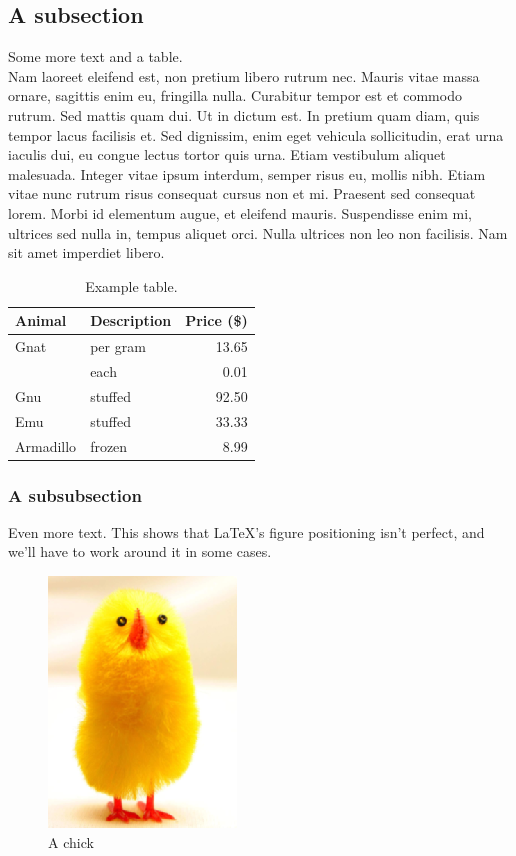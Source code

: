 \documentclass[12pt]{article} %
\begin{document}
\subsection{A subsection}

Some more text and a table. \\

Nam laoreet eleifend est, non pretium libero rutrum nec. Mauris vitae massa ornare, sagittis enim eu, fringilla nulla. Curabitur tempor est et commodo rutrum. Sed mattis quam dui. Ut in dictum est. In pretium quam diam, quis tempor lacus facilisis et. Sed dignissim, enim eget vehicula sollicitudin, erat urna iaculis dui, eu congue lectus tortor quis urna. Etiam vestibulum aliquet malesuada. Integer vitae ipsum interdum, semper risus eu, mollis nibh. Etiam vitae nunc rutrum risus consequat cursus non et mi. Praesent sed consequat lorem. Morbi id elementum augue, et eleifend mauris. Suspendisse enim mi, ultrices sed nulla in, tempus aliquet orci. Nulla ultrices non leo non facilisis. Nam sit amet imperdiet libero. 

\begin{table}[h]
    \centering
    \label{table:ex}
    \begin{tabular}{llr}
        \toprule
        Animal    & Description & Price (\$) \\
        \midrule
        Gnat      & per gram    & 13.65      \\
                  & each        & 0.01       \\
        Gnu       & stuffed     & 92.50      \\
        Emu       & stuffed     & 33.33      \\
        Armadillo & frozen      & 8.99       \\
        \bottomrule
    \end{tabular}
    \caption{Example table.}
\end{table}


\subsubsection{A subsubsection}

Even more text. This shows that \LaTeX's figure positioning isn't perfect, and we'll have to work around it in some cases.

\begin{figure}[h]
    \centering
    \label{figure:chick}
    \includegraphics{figure1.png}
    \caption{A chick}
\end{figure}
\end{document}
